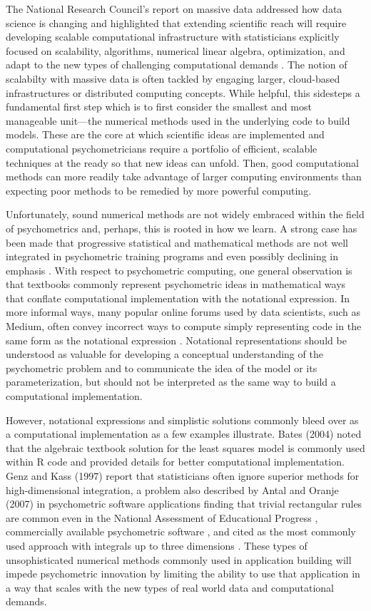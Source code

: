 \documentclass[12pt]{article}
\begin{document}
The National Research Council's report on massive data addressed how data science is changing and highlighted that extending scientific reach will require developing scalable computational infrastructure with statisticians explicitly focused on scalability, algorithms, numerical linear algebra, optimization, and adapt to the new types of challenging computational demands \cite{massive}. The notion of scalabilty with massive data is often tackled by engaging larger, cloud-based infrastructures or distributed computing concepts. While helpful, this sidesteps a fundamental first step which is to first consider the smallest and most manageable unit---the numerical methods used in the underlying code to build models. These are the core at which scientific ideas are implemented and computational psychometricians require a portfolio of efficient, scalable techniques at the ready so that new ideas can unfold. Then, good computational methods can more readily take advantage of larger computing environments than expecting poor methods to be remedied by more powerful computing. 

Unfortunately, sound numerical methods are not widely embraced within the field of psychometrics and, perhaps, this is rooted in how we learn. A strong case has been made that progressive statistical and mathematical methods are not well integrated in psychometric training programs and even possibly declining in emphasis \cite{aiken,townsend}. With respect to psychometric computing, one general observation is that textbooks commonly represent psychometric ideas in mathematical ways that conflate computational implementation with the notational expression. In more informal ways, many popular online forums used by data scientists, such as Medium, often convey incorrect ways to compute simply representing code in the same form as the notational expression \cite{Koseoglu}. Notational representations should be understood as valuable for developing a conceptual understanding of the psychometric problem and to communicate the idea of the model or its parameterization, but should not be interpreted as the same way to build a computational implementation. 

However, notational expressions and simplistic solutions commonly bleed over as a computational implementation as a few examples illustrate. Bates (2004)\nocite{Rnews:Bates:2004} noted that the algebraic textbook solution for the least squares model is commonly used within R code and provided details for better computational implementation. Genz and Kass (1997) report that statisticians often ignore superior methods for high-dimensional integration, a problem also described by Antal and Oranje (2007) in psychometric software applications finding that trivial rectangular rules are common even in the National Assessment of Educational Progress \cite{nces}, commercially available psychometric software \cite{parscale}, and cited as the most commonly used approach with integrals up to three dimensions \cite{bjorn}. These types of unsophisticated numerical methods commonly used in application building will impede psychometric innovation by limiting the ability to use that application in a way that scales with the new types of real world data and computational demands. \nocite{genz, ets:2007}
\end{document}
